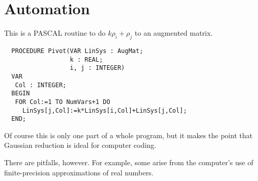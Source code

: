 \section{Automation}

This is a PASCAL routine to do \( k\rho_i+\rho_j \)
to an augmented matrix.
\begin{center}
\begin{verbatim}
  PROCEDURE Pivot(VAR LinSys : AugMat;
                  k : REAL;
                  i, j : INTEGER)
  VAR
   Col : INTEGER;
  BEGIN
   FOR Col:=1 TO NumVars+1 DO
     LinSys[j,Col]:=k*LinSys[i,Col]+LinSys[j,Col];
  END;
\end{verbatim}
\end{center}
Of course this is only one part of a whole program, but it
makes the point that Gaussian reduction is ideal for computer coding.

There are pitfalls, however.
For example, some arise from the computer's use of finite-precision
approximations of real numbers.

